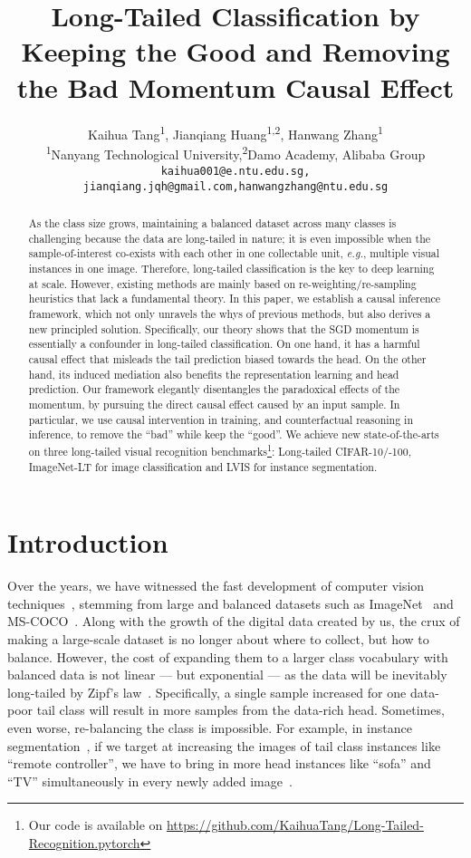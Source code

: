 \documentclass{article}
\title{Long-Tailed Classification
by Keeping the Good and Removing the Bad Momentum Causal Effect}
\author{Kaihua Tang\textsuperscript{1}, \quad Jianqiang Huang\textsuperscript{1,2}, \quad Hanwang Zhang\textsuperscript{1}\\
{\small \textsuperscript{1}Nanyang Technological University,\quad \textsuperscript{2}Damo Academy, Alibaba Group}\\
{\tt\small kaihua001@e.ntu.edu.sg, \quad jianqiang.jqh@gmail.com,\quad hanwangzhang@ntu.edu.sg}\\
}
\newcommand{\eg}{\textit{e.g.}}
\begin{document}
\maketitle



\begin{abstract}
As the class size grows, maintaining a balanced dataset across many classes is challenging because the data are long-tailed in nature; it is even impossible when the sample-of-interest co-exists with each other in one collectable unit, \eg, multiple visual instances in one image. Therefore, long-tailed classification is the key to deep learning at scale. However, existing methods are mainly based on re-weighting/re-sampling heuristics that lack a fundamental theory. In this paper, we establish a causal inference framework, which not only unravels the whys of previous methods, but also derives a new principled solution. Specifically, our theory shows that the SGD momentum is essentially a confounder in long-tailed classification. On one hand, it has a harmful causal effect that misleads the tail prediction biased towards the head. On the other hand, its induced mediation also benefits the representation learning and head prediction. Our framework elegantly disentangles the paradoxical effects of the momentum, by pursuing the direct causal effect caused by an input sample. In particular, we use causal intervention in training, and counterfactual reasoning in inference, to remove the ``bad'' while keep the ``good''. We achieve new state-of-the-arts on three long-tailed visual recognition benchmarks\footnote{Our code is available on \url{https://github.com/KaihuaTang/Long-Tailed-Recognition.pytorch}}: Long-tailed CIFAR-10/-100, ImageNet-LT for image classification and LVIS for instance segmentation.
\end{abstract}



\section{Introduction}
Over the years, we have witnessed the fast development of computer vision techniques~\cite{he2016deep, xie2017aggregated, ren2015faster}, stemming from large and balanced datasets such as ImageNet~\cite{russakovsky2015imagenet} and MS-COCO~\cite{lin2014microsoft}. Along with the growth of the digital data created by us, the crux of making a large-scale dataset is no longer about where to collect, but how to balance. However, the cost of expanding them to a larger class vocabulary with balanced data is not linear --- but exponential --- as the data will be inevitably long-tailed by Zipf's law~\cite{reed2001pareto}. Specifically, a single sample increased for one data-poor tail class will result in more samples from the data-rich head. Sometimes, even worse, re-balancing the class is impossible. For example, in instance segmentation~\cite{gupta2019lvis}, if we target at increasing the images of tail class instances like ``remote controller'', we have to bring in more head instances like ``sofa'' and ``TV'' simultaneously in every newly added image~\cite{wu2020distribution}.
\end{document}
